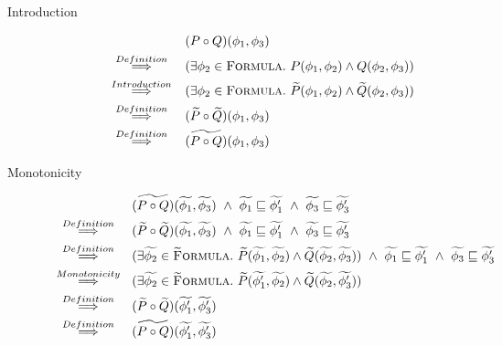 \begin{proofatend}
    \begin{description}
        \item[Introduction] 
        \begin{align*}
        &(P \circ Q)(\phi_1, \phi_3)\\
        \overset{Definition}{~\quad\quad\implies\quad\quad~}
        &(\exists \phi_2 \in \textup{\textsc{Formula}}.~ P(\phi_1, \phi_2) \wedge Q(\phi_2, \phi_3))\\
        \overset{Introduction}{~\quad\quad\implies\quad\quad~}
        &(\exists \phi_2 \in \textup{\textsc{Formula}}.~ \widetilde{P}(\phi_1, \phi_2) \wedge \widetilde{Q}(\phi_2, \phi_3))\\
        \overset{Definition}{~\quad\quad\implies\quad\quad~}
        &(\widetilde{P} \circ \widetilde{Q})(\phi_1, \phi_3)\\
        \overset{Definition}{~\quad\quad\implies\quad\quad~}
        &\widetilde{(P \circ Q)}(\phi_1, \phi_3)\\
        \end{align*}
        
        \item[Monotonicity] 
        \begin{align*}
        &\widetilde{(P \circ Q)}(\widetilde{\phi_1}, \widetilde{\phi_3}) ~\wedge~ \widetilde{\phi_1} \sqsubseteq \widetilde{\phi_1'} ~\wedge~ \widetilde{\phi_3} \sqsubseteq \widetilde{\phi_3'}\\
        \overset{Definition}{~\quad\quad\implies\quad\quad~}
        &(\widetilde{P} \circ \widetilde{Q})(\widetilde{\phi_1}, \widetilde{\phi_3}) ~\wedge~ \widetilde{\phi_1} \sqsubseteq \widetilde{\phi_1'} ~\wedge~ \widetilde{\phi_3} \sqsubseteq \widetilde{\phi_3'}\\
        \overset{Definition}{~\quad\quad\implies\quad\quad~}
        &(\exists \widetilde{\phi_2} \in \textup{\textsc{\ensuremath{\widetilde{\text{F}}}ormula}}.~ \widetilde{P}(\widetilde{\phi_1}, \widetilde{\phi_2}) \wedge \widetilde{Q}(\widetilde{\phi_2}, \widetilde{\phi_3})) ~\wedge~ \widetilde{\phi_1} \sqsubseteq \widetilde{\phi_1'} ~\wedge~ \widetilde{\phi_3} \sqsubseteq \widetilde{\phi_3'}\\
        \overset{Monotonicity}{~\quad\quad\implies\quad\quad~}
        &(\exists \widetilde{\phi_2} \in \textup{\textsc{\ensuremath{\widetilde{\text{F}}}ormula}}.~ \widetilde{P}(\widetilde{\phi_1'}, \widetilde{\phi_2}) \wedge \widetilde{Q}(\widetilde{\phi_2}, \widetilde{\phi_3'}))\\
        \overset{Definition}{~\quad\quad\implies\quad\quad~}
        &(\widetilde{P} \circ \widetilde{Q})(\widetilde{\phi_1'}, \widetilde{\phi_3'})\\
        \overset{Definition}{~\quad\quad\implies\quad\quad~}
        &\widetilde{(P \circ Q)}(\widetilde{\phi_1'}, \widetilde{\phi_3'})\\
        \end{align*}
    \end{description}
\end{proofatend}


